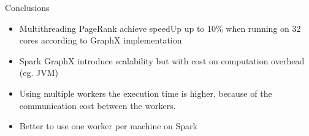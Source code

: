 \documentclass{beamer}
\begin{document}
\begin{frame}{Conclusions}
    \begin{itemize}
        \item{Multithreading PageRank achieve speedUp up to 10\% when running on
        32 cores according to GraphX implementation}
        \item{Spark GraphX introduce scalability but with cost on computation
        overhead (eg. JVM)}
        \item{Using multiple workers the execution time is higher, because of
        the communication cost between the workers.}
        \item{Better to use one worker per machine on Spark}
    \end{itemize}
\end{frame}
\end{document}
